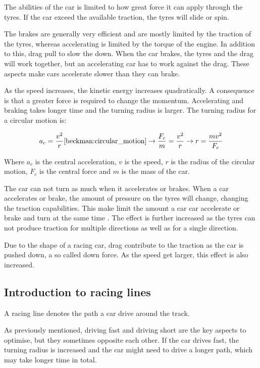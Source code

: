 The abilities of the car is limited to how great force it can apply through the tyres. If the car exceed the available traction, the tyres will slide or spin. 

The brakes are generally very efficient and are mostly limited by the traction of the tyres, whereas accelerating is limited by the torque of the engine. In addition to this, drag pull to slow the down. When the car brakes, the tyres and the drag will work together, but an accelerating car has to work against the drag. These aspects make cars accelerate slower than they can brake.

As the speed increases, the kinetic energy increases quadratically. A consequence is that a greater force is required to change the momentum. Accelerating and braking takes longer time and the turning radius is larger. The turning radius for a circular motion is:

\begin{equation}
a_c = \frac{v^2}{r} \cite{beckman:circular_motion} 
\rightarrow
\frac{F_c}{m} = \frac{v^2}{r} 
\rightarrow
r = \frac{mv^2}{F_c}
\end{equation}

Where $a_c$ is the central acceleration, $v$ is the speed, $r$ is the radius of the circular motion, $F_c$ is the central force and $m$ is the mass of the car.

The car can not turn as much when it accelerates or brakes. When a car accelerates or brake, the amount of pressure on the tyres will change, changing the traction capabilities. This make limit the amount a car car accelerate or brake and turn at the same time \cite{beckman:weight_transfer}. The effect is further increased as the tyres can not produce traction for multiple directions as well as for a single direction\cite{beckman:traction_budget}. 

Due to the shape of a racing car, drag contribute to the traction as the car is pushed down, a so called down force. As the speed get larger, this effect is also increased.


\subsection{Introduction to racing lines}
A racing line denotes the path a car drive around the track.

As previously mentioned, driving fast and driving short are the key aspects to optimise, but they sometimes opposite each other. If the car drives fast, the turning radius is increased and the car might need to drive a longer path, which may take longer time in total. 

